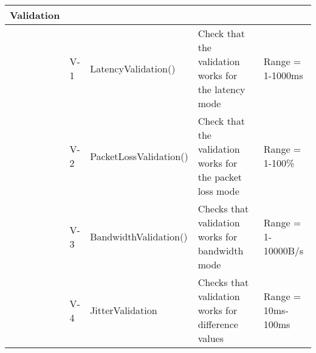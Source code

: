 \begin{longtable}{| p{1.5cm} | p{1.5cm} | p{3cm} | p{4cm} | p{3cm} |}
	Validation &&&& \\ \hline
	&V-1& LatencyValidation() & Check that the validation works for the latency mode & Range = 1-1000ms \\\hline
	&V-2& PacketLossValidation() & Check that the validation works for the packet loss mode & Range = 1-100\%\\\hline
	&V-3& BandwidthValidation() & Checks that validation works for bandwidth mode & Range = 1-10000B/s\\\hline
	&V-4& JitterValidation & Checks that validation works for difference values & Range = 10ms-100ms \\\hline	
	
\end{longtable}